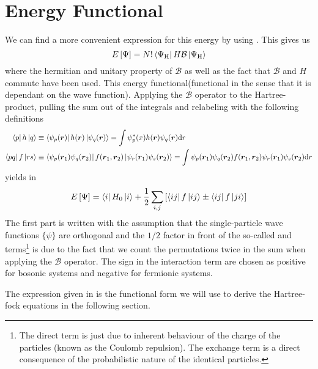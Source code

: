\section{Energy Functional\label{sec:energyFunc}}
    We can find a more convenient expression for this energy by using
    . This gives us
        \begin{equation}
            E\left[\Psi\right] =
            N!\bra{\Psi_{\text{H}}}H\mathcal{B}\ket{\Psi_{\text{H}}}
        \end{equation}
    where the hermitian and unitary property of $\mathcal{B}$ as well as the
    fact that $\mathcal{B}$ and $H$ commute have been used. This energy
    functional(functional in the sense that it is dependant on the wave
    function). Applying the $\mathcal{B}$ operator to the Hartree-product,
    pulling the sum out of the integrals and relabeling with the following
    definitions
        \begin{equation}
            \begin{aligned}
                \bra{p}h\ket{q} &\equiv
                \bra{\psi_p(\boldsymbol{{r}})}h(\boldsymbol{{r}})\ket{\psi_q(\boldsymbol{{r}})} =
                \int\psi^{*}_p(x)h(\boldsymbol{{r}})\psi_q(\boldsymbol{{r}})\mathrm{d} r \\
                \bra{pq}f\ket{rs} &\equiv
                \bra{\psi_p(\boldsymbol{{r}}_1)\psi_q(\boldsymbol{{r}}_2)}
                f(\boldsymbol{{r}}_1,\boldsymbol{{r}}_2)
                \ket{\psi_r(\boldsymbol{{r}}_1)\psi_s(\boldsymbol{{r}}_2)} = \int
                \psi_p(\boldsymbol{{r}}_1)\psi_q(\boldsymbol{{r}}_2) f(\boldsymbol{{r}}_1,\boldsymbol{{r}}_2)
                \psi_r(\boldsymbol{{r}}_1)\psi_s(\boldsymbol{{r}}_2) \mathrm{d} r
            \end{aligned}
        \end{equation}
    yields in
        \begin{equation}
            E\left[\Psi\right] = \bra{i}H_0\ket{i} +
            \frac{1}{2}\sum_{i,j}\left[\bra{ij}f\ket{ij} \pm
            \bra{ij}f\ket{ji}\right]
            \label{eq:ch3Efunc}
        \end{equation}
    The first part is written with the assumption that the single-particle wave
    functions $\{\psi\}$ are orthogonal and the $1/2$ factor in front of the
    so-called  and  terms\footnote{The direct
    term is just due to inherent behaviour of the charge of the particles
    (known as the Coulomb repulsion). The exchange term is a direct consequence
    of the probabilistic nature of the identical particles.} is due to the fact
    that we count the permutations twice in the sum when applying the
    $\mathcal{B}$ operator. The sign in the interaction term are chosen as
    positive for bosonic systems and negative for fermionic systems.

    The expression given in  is the functional form we will
    use to derive the Hartree-fock equations in the following section.
